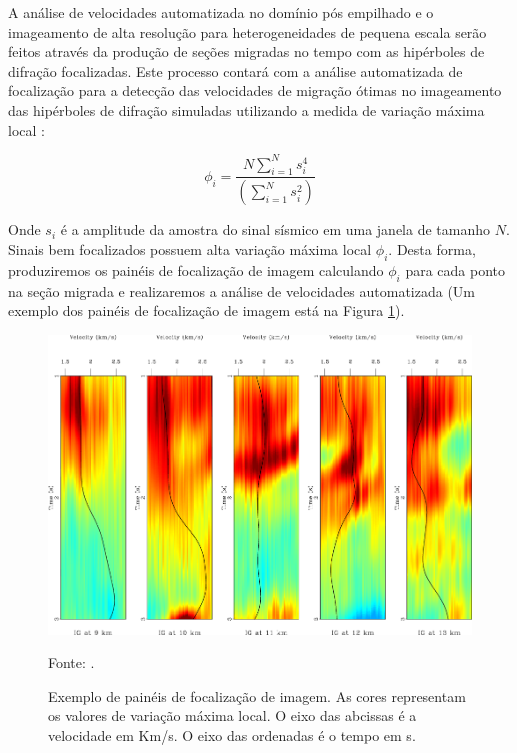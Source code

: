 A análise de velocidades automatizada no domínio pós empilhado e o imageamento de alta resolução
para heterogeneidades de pequena escala serão feitos através da produção de seções migradas no tempo 
com as hipérboles de difração focalizadas. 
Este processo contará com a análise automatizada de focalização para a detecção das
velocidades de migração ótimas no imageamento das hipérboles de difração simuladas 
utilizando a medida de variação máxima local \cite{sep_dif}:

\begin{equation}
 \label{eq:8.2}
 \phi_i = \frac{ N \sum^N_{i=1} s_i^4 }{ \left( \sum^N_{i=1} s_i^2 \right) } 
\end{equation}

Onde $s_i$ é a amplitude da amostra do sinal sísmico em uma janela de tamanho $N$.
Sinais bem focalizados possuem alta variação máxima local $\phi_i$. Desta forma, produziremos
os painéis de focalização de imagem calculando $\phi_i$ para cada ponto na seção migrada
e realizaremos a análise de velocidades automatizada (Um exemplo dos painéis de focalização de imagem
está na Figura \ref{fig:8.4}).

\begin{figure}[htb]
\caption{Exemplo de painéis de focalização de imagem. As cores representam os valores de variação
máxima local. O eixo das abcissas é a velocidade em Km/s. O eixo das ordenadas é o tempo em s.}
\begin{center}
\includegraphics[scale=0.30]{images/panelfig.png}
\vspace{-0.3cm}
\end{center}
\begin{center}
 Fonte: \cite{sep_dif}.
\end{center}
\label{fig:8.4}
\end{figure}


